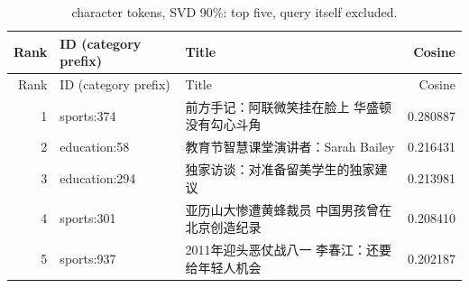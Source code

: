 {\small\renewcommand{\arraystretch}{1.05}
\begin{longtable}{rp{}p{}r}
\caption{character tokens, SVD 90\%: top five, query itself excluded.}\\
\toprule
Rank & ID (category prefix) & Title & Cosine \\ \midrule\endfirsthead
\toprule
Rank & ID (category prefix) & Title & Cosine \\ \midrule\endhead
1 & sports:374 & 前方手记：阿联微笑挂在脸上 华盛顿没有勾心斗角 & 0.280887 \\
2 & education:58 & 教育节智慧课堂演讲者：Sarah Bailey & 0.216431 \\
3 & education:294 & 独家访谈：对准备留美学生的独家建议 & 0.213981 \\
4 & sports:301 & 亚历山大惨遭黄蜂裁员 中国男孩曾在北京创造纪录 & 0.208410 \\
5 & sports:937 & 2011年迎头恶仗战八一 李春江：还要给年轻人机会 & 0.202187 \\
\bottomrule
\end{longtable}
}
